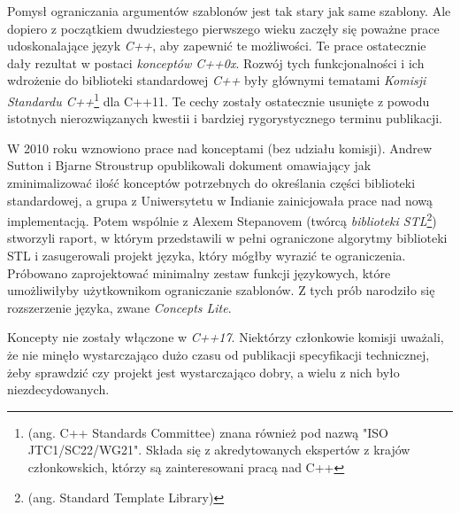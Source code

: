 \documentclass[11pt, a4paper]{article}
\begin{document}
\lstset{language=C++}

Pomysł ograniczania argumentów szablonów jest tak stary jak same szablony. Ale dopiero z początkiem dwudziestego pierwszego wieku zaczęły się poważne prace udoskonalające język \emph{C++}, aby zapewnić te możliwości. Te prace ostatecznie dały rezultat w postaci \emph{konceptów C++0x}. Rozwój tych funkcjonalności i ich wdrożenie do biblioteki standardowej \emph{C++} były głównymi tematami \emph{Komisji Standardu C++}\footnote{(ang. C++ Standards Committee) znana również pod nazwą "ISO JTC1/SC22/WG21". Składa się z akredytowanych ekspertów z krajów członkowskich, którzy są zainteresowani pracą nad C++} dla C++11. Te cechy zostały ostatecznie usunięte z powodu istotnych nierozwiązanych kwestii i bardziej rygorystycznego terminu publikacji.

W 2010 roku wznowiono prace nad konceptami (bez udziału komisji). Andrew Sutton i Bjarne Stroustrup opublikowali dokument omawiający jak zminimalizować ilość konceptów potrzebnych do określania części biblioteki standardowej, a grupa z Uniwersytetu w Indianie zainicjowała prace nad nową implementacją. Potem wspólnie z Alexem Stepanovem (twórcą \emph{biblioteki STL}\footnote{(ang. Standard Template Library)}) stworzyli raport, w którym przedstawili w pełni ograniczone algorytmy biblioteki STL i zasugerowali projekt języka, który mógłby wyrazić te ograniczenia. Próbowano zaprojektować minimalny zestaw funkcji językowych, które umożliwiłyby użytkownikom ograniczanie szablonów. Z tych prób narodziło się rozszerzenie języka, zwane \emph{Concepts Lite}.

Koncepty nie zostały włączone w \emph{C++17}. Niektórzy członkowie komisji uważali, że nie minęło wystarczająco dużo czasu od publikacji specyfikacji technicznej, żeby sprawdzić czy projekt jest wystarczająco dobry, a wielu z nich było niezdecydowanych.
\end{document}
